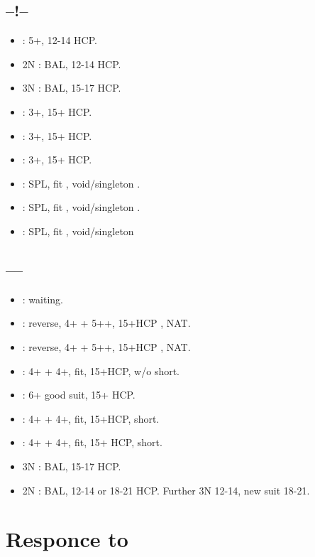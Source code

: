 \documentclass[12pt,twoside,a5paper]{report}%
\begin{document}
	\section*{--!--}
	\begin{itemize}
	\renewcommand{\labelitemi}{}
	\item {} : 5+\di{}, 12-14 HCP.
	\item 2N : BAL, 12-14 HCP.
	\item 3N : BAL, 15-17 HCP.
	\item {} : 3+\he{}, 15+ HCP.
	\item {} : 3+\sp{}, 15+ HCP.
	\item {} : 3+\cl{}, 15+ HCP.
	\item {} : SPL, fit \di{}, void/singleton \he{}.
	\item {} : SPL, fit \di{}, void/singleton \sp{}.
	\item {} : SPL, fit \di{}, void/singleton \cl{}
	\end{itemize}

	\section*{----}
	\begin{itemize}
	\renewcommand{\labelitemi}{}
	\item {} : waiting.
	\item {} : reverse, 4+\he{} + 5+\di{}+, 15+HCP , NAT.
	\item {} : reverse, 4+\sp{} + 5+\di{}+, 15+HCP , NAT.
	\item {} :  4+\di{} + 4+\cl{}, fit, 15+HCP, w/o short.
	\item {} : 6+\di{} good suit, 15+ HCP.
	\item {} : 4+\di{} + 4+\cl{}, fit, 15+HCP, short\he{}.
	\item {} : 4+\di{} + 4+\cl{}, fit, 15+ HCP, short\sp{}.
	\item 3N : BAL, 15-17 HCP.
	\item 2N : BAL, 12-14 or 18-21 HCP. Further 3N 12-14, new suit 18-21.
	\end{itemize}

	\chapter*{Responce to }
	
\end{document}
